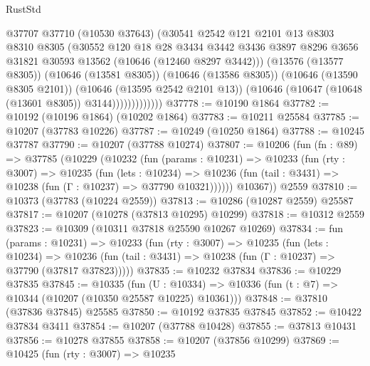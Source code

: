 \begin{lexlean}{RustStd}
\begin{coremodule}
                        @37707
                        @37710
                        (@10530 @37643)
                        (@30541
                          @2542
                          @121
                          @2101
                          @13
                          @8303
                          @8310
                          @8305
                          (@30552
                            @120
                            @18
                            @28
                            @3434
                            @3442
                            @3436
                            @3897
                            @8296
                            @3656
                            @31821
                            @30593
                            @13562
                            (@10646 (@12460 @8297 @3442)))
                          (@13576 (@13577 @8305))
                          (@10646 (@13581 @8305))
                          (@10646 (@13586 @8305))
                          (@10646 (@13590 @8305 @2101))
                          (@10646 (@13595 @2542 @2101 @13))
                          (@10646 (@10647 (@10648 (@13601 @8305)) @3144)))))))))))))
@37778 := @10190 @1864
@37782 := @10192 (@10196 @1864) (@10202 @1864)
@37783 := @10211 @25584
@37785 := @10207 (@37783 @10226)
@37787 := @10249 (@10250 @1864)
@37788 := @10245 @37787
@37790 := @10207 (@37788 @10274)
@37807 := @10206
    (fun (fn : @89) =>
    @37785
      (@10229
        (@10232
          (fun (params : @10231) =>
          @10233
            (fun (rty : @3007) =>
            @10235
              (fun (lets : @10234) =>
              @10236 (fun (tail : @3431) => @10238 (fun (Γ : @10237) => @37790 @10321))))))
        @10367))
    @2559
@37810 := @10373 (@37783 (@10224 @2559))
@37813 := @10286 (@10287 @2559) @25587
@37817 := @10207 (@10278 (@37813 @10295) @10299)
@37818 := @10312 @2559
@37823 := @10309 (@10311 @37818 @25590 @10267 @10269)
@37834 := fun (params : @10231) =>
  @10233
    (fun (rty : @3007) =>
    @10235
      (fun (lets : @10234) =>
      @10236 (fun (tail : @3431) => @10238 (fun (Γ : @10237) => @37790 (@37817 @37823)))))
@37835 := @10232 @37834
@37836 := @10229 @37835
@37845 := @10335
    (fun (U : @10334) => @10336 (fun (t : @7) => @10344 (@10207 (@10350 @25587 @10225) @10361)))
@37848 := @37810 (@37836 @37845) @25585
@37850 := @10192 @37835 @37845
@37852 := @10422 @37834 @3411
@37854 := @10207 (@37788 @10428)
@37855 := @37813 @10431
@37856 := @10278 @37855
@37858 := @10207 (@37856 @10299)
@37869 := @10425
    (fun (rty : @3007) =>
    @10235

\end{coremodule}
\end{lexlean}
